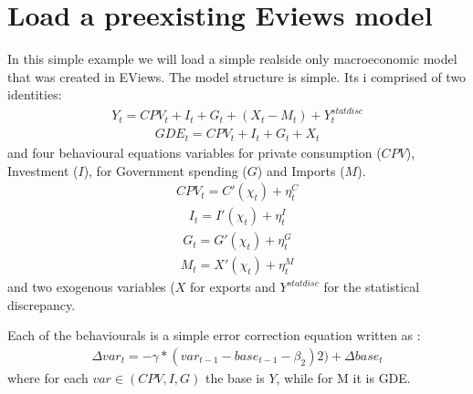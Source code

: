 \documentclass[letterpaper,10pt,english]{jupyterBook}
\begin{document}
\section{Load a pre\sphinxhyphen{}existing Eviews model}
\label{\detokenize{content/05_SimpleModel/SimpleModel:load-a-pre-existing-eviews-model}}
\sphinxAtStartPar
In this simple example we will load a simple real\sphinxhyphen{}side only macroeconomic model that was created in EViews.  The model structure is simple.  Its i comprised of two  identities:
\begin{equation*}
\begin{split} Y_t=CPV_t + I_t + G_t + (X_t - M_t) + Y^{statdisc}_t \end{split}
\end{equation*}\begin{equation*}
\begin{split} GDE_t=CPV_t + I_t + G_t + X_t\end{split}
\end{equation*}
\sphinxAtStartPar
and four behavioural equations variables for private consumption (\(CPV\)), Investment (\(I\)), for Government spending (\(G\)) and Imports (\(M\)).
\begin{equation*}
\begin{split} CPV_t = C'( \chi _t) + \eta^C_t \end{split}
\end{equation*}\begin{equation*}
\begin{split} I_t = I'( \chi _t) + \eta^I_t \end{split}
\end{equation*}\begin{equation*}
\begin{split} G_t = G'( \chi _t) + \eta^G_t \end{split}
\end{equation*}\begin{equation*}
\begin{split} M_t = X'( \chi _t) + \eta^M_t \end{split}
\end{equation*}
\sphinxAtStartPar
and two exogenous variables (\(X\) for exports and \(Y^{statdisc}\) for the statistical discrepancy.

\sphinxAtStartPar
Each of the behaviourals is a simple error correction equation written as :
\begin{equation*}
\begin{split} \Delta var_t = - \gamma *(var_{t-1}- base_{t-1} - \beta_2 ) 2 ) + \Delta base_t \end{split}
\end{equation*}
\sphinxAtStartPar
where for each \(var \in (CPV,I,G)\) the base is \(Y\), while for M it is GDE.
\end{document}
